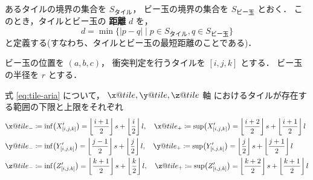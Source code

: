 {%
\subsubsection{}
\label{sec:collision-flow-4}

\begin{dfn}
  あるタイルの境界の集合を \(S_{\text{タイル}}\)， 
  ビー玉の境界の集合を \(S_{\text{ビー玉}}\) とおく．
  このとき，タイルとビー玉の {\bf 距離} \(d\)
  を，
  \[d = \min\{ |p - q| \mid p \in S_{\text{タイル}}, q \in S_{\text{ビー玉}} \}\]
  と定義する(すなわち、タイルとビー玉の最短距離のことである)．
\end{dfn}


ビー玉の位置を
\((a, b, c)\)，
衝突判定を行うタイルを \([i, j, k]\)
とする．
ビー玉の半径を \(r\) とする．

式 \eqref{eq:tile-aria}
について，
\(\x@tile, \y@tile, \z@tile\) 軸
におけるタイルが存在する範囲の下限と上限をそれぞれ
\begin{align*}
  &\x@tile_- \coloneqq \inf \bigl( X^\prime_{[i, j, k]} \bigr)
  = \biggl\lfloor \frac{i + 1}{2} \biggr\rfloor \, s + \biggl\lfloor \frac{i}{2} \biggr\rfloor  \, l, \quad
  \x@tile_+\coloneqq \sup \bigl( X^\prime_{[i, j, k]} \bigr)
  = \biggl\lfloor \frac{i + 2}{2} \biggr\rfloor \, s + \biggl\lfloor \frac{i + 1}{2} \biggr\rfloor \, l \\
  &\y@tile_- \coloneqq \inf \bigl( Y^\prime_{[i, j, k]} \bigr)
  = \biggl\lfloor \frac{j - 1}{2} \biggr\rfloor \, s + \biggl\lfloor \frac{j}{2} \biggr\rfloor  \, l, \quad
  \y@tile_+\coloneqq \sup \bigl( Y^\prime_{[i, j, k]} \bigr)
  = \biggl\lfloor \frac{j}{2} \biggr\rfloor \, s + \biggl\lfloor \frac{j + 1}{2} \biggr\rfloor \, l \\
  &\z@tile_- \coloneqq \inf \bigl( Z^\prime_{[i, j, k]} \bigr)
  = \biggl\lfloor \frac{k + 1}{2} \biggr\rfloor \, s + \biggl\lfloor \frac{k}{2} \biggr\rfloor  \, l, \quad
  \z@tile_+\coloneqq \sup \bigl( Z^\prime_{[i, j, k]} \bigr)
  = \biggl\lfloor \frac{k + 2}{2} \biggr\rfloor \, s + \biggl\lfloor \frac{k + 1}{2} \biggr\rfloor \, l
\end{align*}

}
